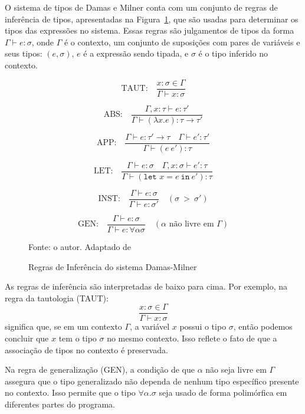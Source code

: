 O sistema de tipos de Damas e Milner conta com um conjunto de regras de inferência de tipos, apresentadas na Figura~\ref{eq:type-inference}, que são usadas para determinar os tipos das expressões no sistema.
Essas regras são julgamentos de tipos da forma $\Gamma \vdash e: \sigma$, onde $\Gamma$ é o contexto, um conjunto de suposições com pares de variáveis e seus tipos: $(e, \sigma)$, $e$ é a expressão sendo tipada, e $\sigma$ é o tipo inferido no contexto.

\begin{figure}[ht!]
  \caption{Regras de Inferência do sistema Damas-Milner}
  \centering
  \[
    \text{TAUT:} \quad \frac{x : \sigma \in \Gamma}{\Gamma \vdash x : \sigma}
  \]

  \[
    \text{ABS:} \quad \frac{\Gamma, x : \tau \vdash e : \tau'}{\Gamma \vdash (\lambda x. e) : \tau \to \tau'}
  \]

  \[
    \text{APP:} \quad \frac{\Gamma \vdash e : \tau' \to \tau \quad \Gamma \vdash e' : \tau'}{\Gamma \vdash (e \ e') : \tau}
  \]

  \[
    \text{LET:} \quad \frac{\Gamma \vdash e : \sigma \quad \Gamma, x : \sigma \vdash e' : \tau}{\Gamma \vdash (\texttt{let } x = e \ \texttt{in} \ e') : \tau}
  \]

  \[
    \text{INST:} \quad \frac{\Gamma \vdash e : \sigma}{\Gamma \vdash e : \sigma'} \quad \scriptstyle (\sigma\ >\ \sigma')
  \]

  \[
    \text{GEN:} \quad \frac{\Gamma \vdash e : \sigma}{\Gamma \vdash e : \forall \alpha \sigma} \quad \scriptstyle (\alpha \text{ não livre em } \Gamma)
  \]

  \small{Fonte: o autor. Adaptado de~\cite{DAMAS1982}}\label{eq:type-inference}
\end{figure}

As regras de inferência são interpretadas de baixo para cima.
Por exemplo, na regra da tautologia (TAUT):
\[
  \frac{x : \sigma \in \Gamma}{\Gamma \vdash x : \sigma}
\]
significa que, se em um contexto $\Gamma$, a variável $x$ possui o tipo $\sigma$, então podemos concluir que $x$ tem o tipo $\sigma$ no mesmo contexto.
Isso reflete o fato de que a associação de tipos no contexto é preservada.

Na regra de generalização (GEN), a condição de que $\alpha$ não seja livre em $\Gamma$ assegura que o tipo generalizado não dependa de nenhum tipo específico presente no contexto.
Isso permite que o tipo $\forall \alpha. \sigma$ seja usado de forma polimórfica em diferentes partes do programa.

